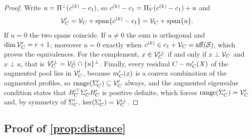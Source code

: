 \begin{proof}
Write $u=\Pi^\perp(c^{(k)}-c_1)$, so
$c^{(k)}-c_1=\Pi_V(c^{(k)}-c_1)+u$ and
\[
  \mathcal V_C'=\mathcal V_C+\operatorname{span}\{c^{(k)}-c_1\}
  =\mathcal V_C+\operatorname{span}\{u\}.
\]
If $u=0$ the two spans coincide. If $u\neq0$ the sum is orthogonal and
$\dim\mathcal V_C'=r+1$; moreover $u=0$ exactly when
$c^{(k)}\in c_1+\mathcal V_C=\operatorname{aff}(\mathcal S)$, which proves the equivalences.
For the complement, $x\in\mathcal V_C'^{\perp}$ if and only if $x\perp\mathcal V_C$
and $x\perp u$, that is $\mathcal V_C'^\perp=\mathcal V_C^\perp\cap\{u\}^\perp$.
Finally, every residual $C-m_C'(X)$ of the augmented pool lies in
$\mathcal V_C'$, because $m_C'(x)$ is a convex combination of the augmented
profiles, so $\operatorname{range}(\Sigma_C')\subseteq\mathcal V_C'$ always, and the augmented
eigenvalue condition states that
$B_C'^\top\Sigma_C'B_C'$ is positive definite, which forces
$\operatorname{range}(\Sigma_C')=\mathcal V_C'$ and, by symmetry of $\Sigma_C'$,
$\operatorname{ker}(\Sigma_C')=\mathcal V_C'^{\perp}$.
\end{proof}

\subsection{Proof of \texorpdfstring{\cref{prop:distance}}{Proposition 3}}
\label{app:proof-distance}


